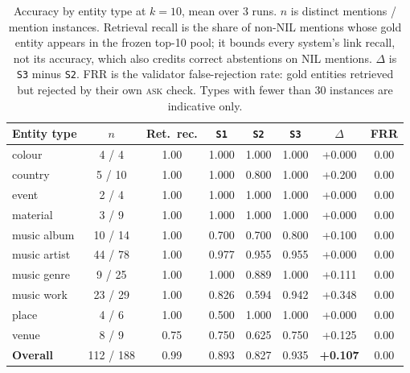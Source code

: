 \begin{table}[t]
\centering
\small
\caption{Accuracy by entity type at $k=10$, mean over 3 runs. $n$ is distinct mentions / mention instances. Retrieval recall is the share of non-NIL mentions whose gold entity appears in the frozen top-10 pool; it bounds every system's link recall, not its accuracy, which also credits correct abstentions on NIL mentions. $\Delta$ is \texttt{S3} minus \texttt{S2}. FRR is the validator false-rejection rate: gold entities retrieved but rejected by their own \textsc{ask} check. Types with fewer than 30 instances are indicative only.}
\label{tab:el-per-type}
\begin{tabular}{lccccccc}
\toprule
Entity type & $n$ & Ret.\ rec. & \texttt{S1} & \texttt{S2} & \texttt{S3} & $\Delta$ & FRR \\
\midrule
colour & 4 / 4 & 1.00 & 1.000 & 1.000 & 1.000 & +0.000 & 0.00 \\
country & 5 / 10 & 1.00 & 1.000 & 0.800 & 1.000 & +0.200 & 0.00 \\
event & 2 / 4 & 1.00 & 1.000 & 1.000 & 1.000 & +0.000 & 0.00 \\
material & 3 / 9 & 1.00 & 1.000 & 1.000 & 1.000 & +0.000 & 0.00 \\
music album & 10 / 14 & 1.00 & 0.700 & 0.700 & 0.800 & +0.100 & 0.00 \\
music artist & 44 / 78 & 1.00 & 0.977 & 0.955 & 0.955 & +0.000 & 0.00 \\
music genre & 9 / 25 & 1.00 & 1.000 & 0.889 & 1.000 & +0.111 & 0.00 \\
music work & 23 / 29 & 1.00 & 0.826 & 0.594 & 0.942 & +0.348 & 0.00 \\
place & 4 / 6 & 1.00 & 0.500 & 1.000 & 1.000 & +0.000 & 0.00 \\
venue & 8 / 9 & 0.75 & 0.750 & 0.625 & 0.750 & +0.125 & 0.00 \\
\midrule
\textbf{Overall} & 112 / 188 & 0.99 & 0.893 & 0.827 & 0.935 & \textbf{+0.107} & 0.00 \\
\bottomrule
\end{tabular}
\end{table}
